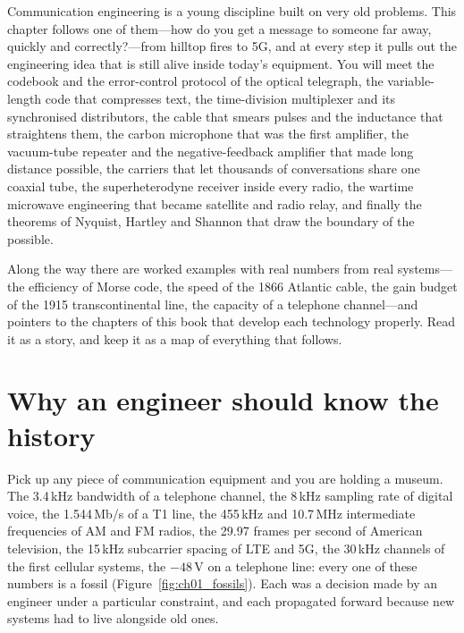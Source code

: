 \begin{chapterintro}
Communication engineering is a young discipline built on very old problems. This chapter follows
one of them---how do you get a message to someone far away, quickly and correctly?---from hilltop
fires to 5G, and at every step it pulls out the engineering idea that is still alive inside today's
equipment. You will meet the codebook and the error-control protocol of the optical telegraph, the
variable-length code that compresses text, the time-division multiplexer and its synchronised
distributors, the cable that smears pulses and the inductance that straightens them, the carbon
microphone that was the first amplifier, the vacuum-tube repeater and the negative-feedback
amplifier that made long distance possible, the carriers that let thousands of conversations share
one coaxial tube, the superheterodyne receiver inside every radio, the wartime microwave engineering
that became satellite and radio relay, and finally the theorems of Nyquist, Hartley and Shannon that
draw the boundary of the possible.

Along the way there are worked examples with real numbers from real systems---the efficiency of
Morse code, the speed of the 1866 Atlantic cable, the gain budget of the 1915 transcontinental
line, the capacity of a telephone channel---and pointers to the chapters of this book that develop
each technology properly. Read it as a story, and keep it as a map of everything that follows.
\end{chapterintro}

\section{Why an engineer should know the history}
\label{sec:ch01:why}

Pick up any piece of communication equipment and you are holding a museum. The 3.4\,kHz bandwidth
of a telephone channel, the 8\,kHz sampling rate of digital voice, the 1.544\,Mb/s of a T1 line, the
455\,kHz and 10.7\,MHz intermediate frequencies of AM and FM radios, the 29.97 frames per second of
American television, the 15\,kHz subcarrier spacing of LTE and 5G, the 30\,kHz channels of the first
cellular systems, the $-48$\,V on a telephone line: every one of these numbers is a fossil
(Figure~\ref{fig:ch01_fossils}). Each was
a decision made by an engineer under a particular constraint, and each propagated forward because
new systems had to live alongside old ones.

